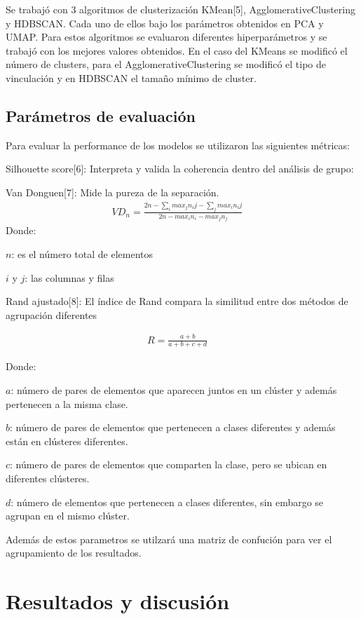 \documentclass{article}
\begin{document}
Se trabajó con 3 algoritmos de clusterización KMean[5], AgglomerativeClustering y HDBSCAN. Cada uno de ellos bajo los parámetros obtenidos en PCA y UMAP. Para estos algoritmos se evaluaron diferentes hiperparámetros y se trabajó con los mejores valores obtenidos.
En el caso del KMeans se modificó el número de clusters, para el AgglomerativeClustering se modificó el tipo de vinculación y en HDBSCAN el tamaño mínimo de cluster.


\subsection{Parámetros de evaluación}
Para evaluar la performance de los modelos se utilizaron las siguientes métricas:


Silhouette score[6]: Interpreta y valida la coherencia dentro del análisis de grupo:


Van Donguen[7]: Mide la pureza de la separación.
\begin{gather*}
\displaystyle VD_n = \frac{2n-\sum_i max_j n_ij -\sum_j max_i n_ij}{2n-max_i n_i- max_j n_j}\quad
\end{gather*}
Donde:

\(n\): es el número total de elementos

\(i\) y \(j\): las columnas y filas


Rand ajustado[8]: El índice de Rand compara la similitud entre dos métodos de agrupación diferentes

\begin{gather*}
\displaystyle R =\frac{a + b}{a+b+c+d}\quad
\end{gather*}

Donde:

\(a\): número de pares de elementos que aparecen juntos en un clúster y
además pertenecen a la misma clase.

\(b\): número de pares de elementos que pertenecen a clases diferentes
y además están en clústeres diferentes.

\(c\): número de pares de elementos que comparten la clase, pero se
ubican en diferentes clústeres.

\(d\): número de elementos que pertenecen a clases diferentes, sin
embargo se agrupan en el mismo clúster.

Además de estos parametros se utilzará una matriz de confución para ver el agrupamiento de los resultados.

\section{Resultados y discusión}
\label{headings}
\end{document}
